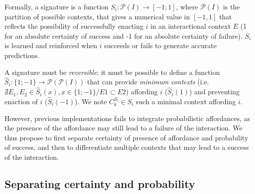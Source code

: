 \documentclass[conference]{IEEEtran}
\begin{document}
Formally, a signature is a function $S_i : \mathcal{P}(I) \rightarrow [-1;1]$, where $\mathcal{P}(I)$ is the partition of possible contexts, that gives a numerical value in $[-1, 1]$ that reflects the possibility of successfully enacting $i$ in an interactional context $E$ (1 for an absolute certainty of success and -1 for an absolute certainty of failure). $S_i$ is learned and reinforced when $i$ succeeds or fails to generate accurate predictions. %

A signature must be \textit{reversible}: it must be possible to define a function $\hat{S}_i : \{1;-1\} \rightarrow \mathcal{P}(\mathcal{P}(I))$ that can provide \textit{minimum contexts} (i.e. $\nexists E_1,\!E_2\!\in\!\hat{S}_i(x), x\!\in\!\{1;-1\} / E1\!\subset\!E2$) affording $i$ ($\hat{S}_i(1)$) and preventing enaction of $i$ ($\hat{S}_i(-1)$). We note $C_k^{S_i} \in S_i$ such a minimal context affording $i$.

However, previous implementations fails to integrate probabilistic affordances, as the presence of the affordance may still lead to a failure of the interaction. We thus propose to first separate certainty of presence of affordance and probability of success, and then to differentiate multiple contexts that may lead to a success of the interaction.



\subsection{Separating certainty and probability}\label{AA}
\end{document}
